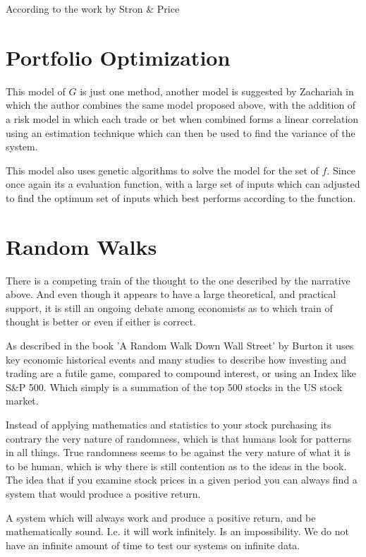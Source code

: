 \documentclass[12pt]{article}
\begin{document}
    According to the work by Stron \& Price \cite{Storn-Price}

\section{Portfolio Optimization}

    This model of \(G\) is just one method, another model is suggested by Zachariah
    \cite{Zachariah} in which the author combines the same model proposed above, with the 
    addition of a risk model in which each trade or bet when combined forms a linear correlation
    using an estimation technique which can then be used to find the variance of the system.

    This model also uses genetic algorithms to solve the model for the set of \(f\). 
    Since once again its a evaluation function, 
    with a large set of inputs which can adjusted to find the optimum set of inputs which best 
    performs according to the function.

\section{Random Walks}

    There is a competing train of the thought to the one described by the narrative above. And 
    even though it appears to have a large theoretical, and practical support, it is still an 
    ongoing debate among economists as to which train of thought is better or even if either is 
    correct.

    As described in the book 'A Random Walk Down Wall Street' by Burton \cite{Burton} it uses
    key economic historical events and many studies to describe how investing and trading are
    a futile game, compared to compound interest, or using an Index like S\&P 500. Which
    simply is a summation of the top 500 stocks in the US stock market.

    Instead of applying mathematics and statistics to your stock purchasing its contrary the 
    very nature of randomness, which is that humans look for patterns in all things. True 
    randomness seems to be against the very nature of what it is to be human, which is why
    there is still contention as to the ideas in the book. The idea that if you examine stock
    prices in a given period you can always find a system that would produce a positive return.

    A system which will always work and produce a positive return, and be mathematically sound. 
    I.e. it will work infinitely. Is an impossibility. We do not have an infinite amount of
    time to test our systems on infinite data.
\end{document}
